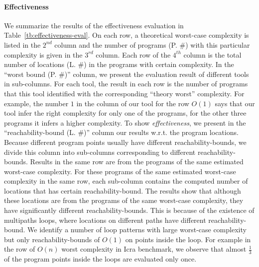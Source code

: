 \paragraph{Effectiveness}
We summarize the results of the effectiveness evaluation in Table~\ref{tb:effectiveness-eval}.
On each row, a theoretical worst-case complexity is listed in the $2^{nd}$ column and the number of programs (P. \#) with this particular complexity is given in the $3^{rd}$ column.
Each row of the $4^{th}$ column is the total number of locations (L. \#) in the programs with certain complexity.
In the ``worst bound (P. \#)'' column, we present the evaluation result of different tools in sub-columns.
For each tool, the result in each row is the number of programs that this tool identified with the corresponding ``theory worst'' complexity. For example, the number $1$ in the column of our tool for the row $O(1)$ says that our tool infer the right complexity for only one of the programs, for the other three programs it infers a higher complexity.
To show \textit{effectiveness}, 
we present in the ``{reachability-bound (L. \#)}'' column our results w.r.t. the program locations. 
Because different program points usually have different reachability-bounds,
we divide this column into sub-columns corresponding to different reachability-bounds.
Results in the same row are from the programs of the same estimated worst-case complexity.
For these programs of the same estimated worst-case complexity in the same row, each sub-column contains the computed number of locations that has certain reachability-bound.
The results show that although these locations are from the programs of the same worst-case complexity, they have significantly different reachability-bounds. This is because of the existence of multipaths loops, where locations on different paths have different reachability-bound.
We identify a number of loop patterns with large worst-case complexity but only reachability-bounds of $O(1)$ on points inside the loop.
For example in the row of $O(n)$ worst complexity in Icra benchmark, we observe that
almost $\frac{1}{3}$ of the program points inside the loops are evaluated only once.
